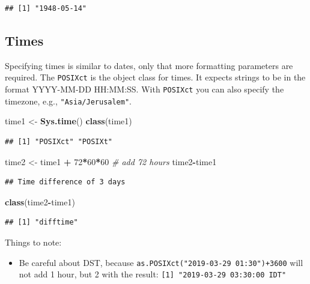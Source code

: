 \documentclass[]{book}
\newenvironment{Shaded}{\begin{snugshade}}{\end{snugshade}}
\newcommand{\CommentTok}[1]{\textcolor[rgb]{0.56,0.35,0.01}{\textit{#1}}}
\newcommand{\DecValTok}[1]{\textcolor[rgb]{0.00,0.00,0.81}{#1}}
\newcommand{\KeywordTok}[1]{\textcolor[rgb]{0.13,0.29,0.53}{\textbf{#1}}}
\newcommand{\NormalTok}[1]{#1}
\newcommand{\OperatorTok}[1]{\textcolor[rgb]{0.81,0.36,0.00}{\textbf{#1}}}
\newcommand{\StringTok}[1]{\textcolor[rgb]{0.31,0.60,0.02}{#1}}
\providecommand{\tightlist}{%
  \setlength{\itemsep}{0pt}\setlength{\parskip}{0pt}}
\theoremstyle{definition}
\theoremstyle{definition}
\theoremstyle{definition}
\theoremstyle{remark}
\begin{document}
\begin{verbatim}
## [1] "1948-05-14"
\end{verbatim}

\hypertarget{times}{%
\subsection{Times}\label{times}}

Specifying times is similar to dates, only that more formatting parameters are required.
The \texttt{POSIXct} is the object class for times.
It expects strings to be in the format YYYY-MM-DD HH:MM:SS.
With \texttt{POSIXct} you can also specify the timezone, e.g., \texttt{"Asia/Jerusalem"}.

\begin{Shaded}
\begin{Highlighting}[]
\NormalTok{time1 <-}\StringTok{ }\KeywordTok{Sys.time}\NormalTok{()}
\KeywordTok{class}\NormalTok{(time1)}
\end{Highlighting}
\end{Shaded}

\begin{verbatim}
## [1] "POSIXct" "POSIXt"
\end{verbatim}

\begin{Shaded}
\begin{Highlighting}[]
\NormalTok{time2 <-}\StringTok{ }\NormalTok{time1 }\OperatorTok{+}\StringTok{ }\DecValTok{72}\OperatorTok{*}\DecValTok{60}\OperatorTok{*}\DecValTok{60} \CommentTok{# add 72 hours}
\NormalTok{time2}\OperatorTok{-}\NormalTok{time1}
\end{Highlighting}
\end{Shaded}

\begin{verbatim}
## Time difference of 3 days
\end{verbatim}

\begin{Shaded}
\begin{Highlighting}[]
\KeywordTok{class}\NormalTok{(time2}\OperatorTok{-}\NormalTok{time1)}
\end{Highlighting}
\end{Shaded}

\begin{verbatim}
## [1] "difftime"
\end{verbatim}

Things to note:

\begin{itemize}
\tightlist
\item
  Be careful about DST, because \texttt{as.POSIXct("2019-03-29\ 01:30")+3600} will not add 1 hour, but 2 with the result: \texttt{{[}1{]}\ "2019-03-29\ 03:30:00\ IDT"}
\end{itemize}
\end{document}
